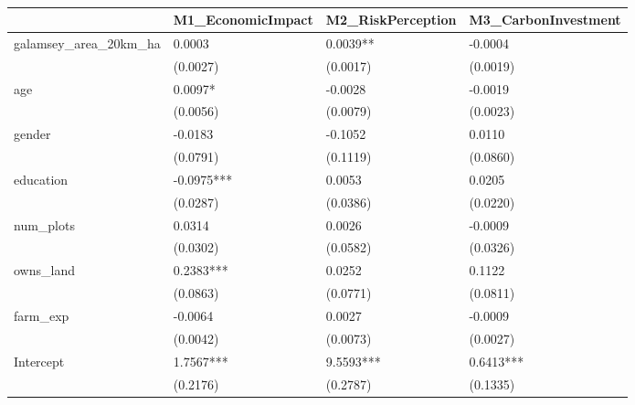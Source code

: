 \begin{table}
\caption{}
\label{}
\begin{center}
\begin{tabular}{llll}
\hline
                               & M1\_EconomicImpact & M2\_RiskPerception & M3\_CarbonInvestment  \\
\hline
galamsey\_area\_20km\_ha       & 0.0003             & 0.0039**           & -0.0004               \\
                               & (0.0027)           & (0.0017)           & (0.0019)              \\
age                            & 0.0097*            & -0.0028            & -0.0019               \\
                               & (0.0056)           & (0.0079)           & (0.0023)              \\
gender                         & -0.0183            & -0.1052            & 0.0110                \\
                               & (0.0791)           & (0.1119)           & (0.0860)              \\
education                      & -0.0975***         & 0.0053             & 0.0205                \\
                               & (0.0287)           & (0.0386)           & (0.0220)              \\
num\_plots                     & 0.0314             & 0.0026             & -0.0009               \\
                               & (0.0302)           & (0.0582)           & (0.0326)              \\
owns\_land                     & 0.2383***          & 0.0252             & 0.1122                \\
                               & (0.0863)           & (0.0771)           & (0.0811)              \\
farm\_exp                      & -0.0064            & 0.0027             & -0.0009               \\
                               & (0.0042)           & (0.0073)           & (0.0027)              \\
Intercept                      & 1.7567***          & 9.5593***          & 0.6413***             \\
                               & (0.2176)           & (0.2787)           & (0.1335)              \\

\end{tabular}
\end{center}
\end{table}
